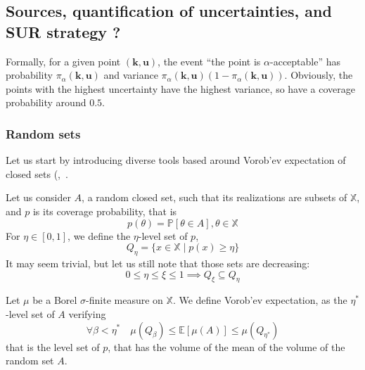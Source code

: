 \documentclass[a4paper,11pt]{article}
\newcommand{\Ex}{\mathbb{E}}
\newcommand{\Prob}{\mathbb{P}}
\newcommand{\Xspace}{\mathbb{X}}
\theoremstyle{defi}
\numberwithin{thmCounter}{section}
\begin{document}
\subsection{Sources, quantification of uncertainties, and SUR strategy ?}
Formally, for a given point $(\mathbf{k},\mathbf{u})$, the event ``the point is $\alpha$-acceptable'' has probability $\pi_{\alpha}(\mathbf{k},\mathbf{u})$ and variance $\pi_{\alpha}(\mathbf{k},\mathbf{u}) (1-\pi_{\alpha}(\mathbf{k},\mathbf{u}))$. Obviously, the points with the highest uncertainty have the highest variance, so have a coverage probability around $0.5$.

\subsubsection{Random sets}
Let us start by introducing diverse tools based around Vorob'ev expectation of closed sets (\cite{el_amri_analyse_2019},~\cite{heinrich_level_2012}. 


Let us consider $A$, a random closed set, such that its realizations are subsets of $\Xspace$, and $p$ is its coverage probability, that is
\begin{equation}
  p(\theta) = \Prob\left[\theta\in A\right], \theta\in\Xspace
\end{equation}
For $\eta \in [0, 1]$, we define the $\eta$-level set of $p$,
\begin{equation}
  Q_{\eta} = \{x\in\Xspace \mid p(x) \geq \eta \}
\end{equation}
It may seem trivial, but let us still note that those sets are decreasing:
\begin{equation}
  0\leq \eta \leq \xi \leq 1 \implies Q_{\xi} \subseteq Q_{\eta}
\end{equation}

Let $\mu$ be a Borel $\sigma$-finite measure on $\Xspace$. We define Vorob'ev expectation, as the $\eta^*$-level set of $A$ verifying
\begin{equation}
  \forall \beta < \eta^* \quad \mu(Q_{\beta}) \leq \Ex[\mu(A)] \leq \mu(Q_{\eta^*})
\end{equation}
that is the level set of $p$, that has the volume of the mean of the volume of the random set $A$.
\end{document}
